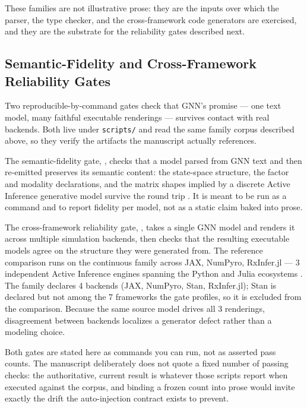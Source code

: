 \documentclass[
  english,
  9pt,
]{extarticle}
\begin{document}
These families are not illustrative prose: they are the inputs over
which the parser, the type checker, and the cross-framework code
generators are exercised, and they are the substrate for the reliability
gates described next.

\subsection{Semantic-Fidelity and Cross-Framework Reliability
Gates}\label{semantic-fidelity-and-cross-framework-reliability-gates}

Two reproducible-by-command gates check that GNN's promise --- one text
model, many faithful executable renderings --- survives contact with
real backends. Both live under \texttt{scripts/} and read the same
family corpus described above, so they verify the artifacts the
manuscript actually references.

The semantic-fidelity gate,
, checks that a model
parsed from GNN text and then re-emitted preserves its semantic content:
the state-space structure, the factor and modality declarations, and the
matrix shapes implied by a discrete Active Inference generative model
survive the round trip \citep{dacosta2020}. It is meant to be run as a
command and to report fidelity per model, not as a static claim baked
into prose.

The cross-framework reliability gate,
, takes a single
GNN model and renders it across multiple simulation backends, then
checks that the resulting executable models agree on the structure they
were generated from. The reference comparison runs on the continuous
family across JAX, NumPyro, RxInfer.jl --- 3 independent Active
Inference engines spanning the Python and Julia ecosystems
\citep{heins2022}. The family declares 4 backends (JAX, NumPyro, Stan,
RxInfer.jl); Stan is declared but not among the 7 frameworks the gate
profiles, so it is excluded from the comparison. Because the same source
model drives all 3 renderings, disagreement between backends localizes a
generator defect rather than a modeling choice.

Both gates are stated here as commands you can run, not as asserted pass
counts. The manuscript deliberately does not quote a fixed number of
passing checks: the authoritative, current result is whatever those
scripts report when executed against the corpus, and binding a frozen
count into prose would invite exactly the drift the auto-injection
contract exists to prevent.
\end{document}
